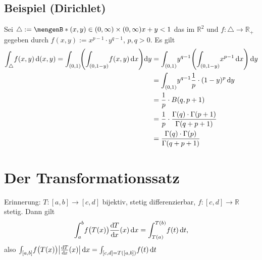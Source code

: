 \subsection{Beispiel (Dirichlet)} %
\label{sub:713}
Sei $\triangle := \set[(x,y) \in (0,\infty) \times (0,\infty)]{x+y<1} $ das  im $\mathds{R}^2$ und $f : \triangle \to \mathds{R}_+$ gegeben durch
$f(x,y) := x^{p-1} \cdot y^{q-1}$, $p,q >0$. Es gilt
\begin{align*}
	\int_{\triangle}\! f(x,y)  \, \mathrm{d}(x,y) =  \int_{(0,1)}\! \enbrace*{\int_{(0,1-y)}\! f(x,y)  \, \mathrm{d}x }   \mathrm{d}y 
	&= \int_{(0,1)}\! y^{q-1} \enbrace*{\int_{(0,1-y)}\! x^{p-1}  \, \mathrm{d}x }  \, \mathrm{d}y \\ 
	&= \int_{(0,1)}\! y^{q-1} \frac{1}{p} \cdot (1-y)^p  \, \mathrm{d}y \\
	&= \frac{1}{p} \cdot B(q,p+1) \\
	&= \frac{1}{p} \cdot \frac{\Gamma(q) \cdot \Gamma(p+1)}{\Gamma(q+p+1)} \\
	&= \frac{\Gamma(q) \cdot \Gamma(p)}{\Gamma(q+p+1)}  
\end{align*}
\newpage

\section{Der Transformationssatz} %
\label{sec:8}
Erinnerung: $T : [a,b] \to [c,d]$ bijektiv, stetig differenzierbar, $f : [c,d] \to \mathds{R}$ stetig. Dann gilt 
\[
	\int_{a} ^{b} \! f\big(T(x)\big) \frac{\mathrm{d}\mkern-1.0mu T}{\mathrm{d}\mkern-1.0mu x} (x) \, \mathrm{d}x  = \int_{T(a)} ^{T(b)} \! f(t)  \, \mathrm{d}t,
\]
also $\int_{[a,b]}\! f\big( T(x)\big) \abs*{ \diffd{T}{x}(x)}  \, \mathrm{d}x = \int_{[c,d] = T([a,b])}\! f(t)  \, \mathrm{d}t$

